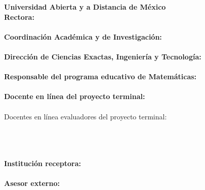 {\huge\bfseries Universidad Abierta y a Distancia de México} \\ [1cm]
{\large\bfseries Rectora:\\[0.25cm]} \rectora \\ [1cm]
{\large\bfseries Coordinación Académica y de Investigación:}\\[0.25cm] \Coordinacion \\ [1cm]
{\large\bfseries Dirección de Ciencias Exactas, Ingeniería y Tecnología:}\\[0.25cm] \Direccion\\ [1cm]
{\large\bfseries Responsable del programa educativo de Matemáticas:}\\[0.25cm] \Programa \\ [1cm]
{\large\bfseries Docente en línea del proyecto terminal:}\\[0.25cm] \asesorinterno \\ [1cm]
\large Docentes en línea evaluadores del proyecto terminal: 

\begin{flushleft}
{\bfseries\Docenteuno}\\[0.25cm]
{\bfseries\Docentedos}\\[0.25cm]
{\bfseries\Docentetres}\\[0.25cm]


{\large\bfseries Institución receptora: }\\[0.25cm] \Institucion\\ [1cm]
{\large\bfseries Asesor externo:}\\[0.25cm] \asesorexterno\\ [0.25cm]


\end{flushleft}